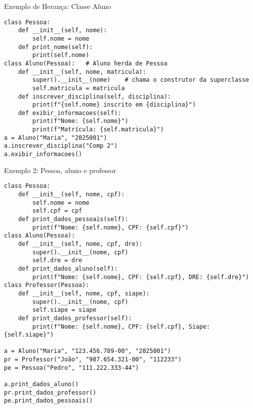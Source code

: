 \begin{frame}[fragile]{Exemplo de Herança: Classe Aluno}

    \small

    \begin{verbatim}
class Pessoa:
    def __init__(self, nome):
        self.nome = nome
    def print_nome(self):
        print(self.nome)
class Aluno(Pessoa):   # Aluno herda de Pessoa
    def __init__(self, nome, matricula):
        super().__init__(nome)    # chama o construtor da superclasse
        self.matricula = matricula
    def inscrever_disciplina(self, disciplina):
        print(f"{self.nome} inscrito em {disciplina}")
    def exibir_informacoes(self):
        print(f"Nome: {self.nome}")
        print(f"Matrícula: {self.matricula}")
a = Aluno("Maria", "2025001")
a.inscrever_disciplina("Comp 2")
a.exibir_informacoes()
\end{verbatim}

\end{frame}



\begin{frame}[fragile]{Exemplo 2: Pessoa, aluno e professor}

    \small
    \begin{verbatim}
class Pessoa:
    def __init__(self, nome, cpf):
        self.nome = nome
        self.cpf = cpf
    def print_dados_pessoais(self):
        print(f"Nome: {self.nome}, CPF: {self.cpf}")
class Aluno(Pessoa):
    def __init__(self, nome, cpf, dre):
        super().__init__(nome, cpf)
        self.dre = dre
    def print_dados_aluno(self):
        print(f"Nome: {self.nome}, CPF: {self.cpf}, DRE: {self.dre}")
class Professor(Pessoa):
    def __init__(self, nome, cpf, siape):
        super().__init__(nome, cpf)
        self.siape = siape
    def print_dados_professor(self):
        print(f"Nome: {self.nome}, CPF: {self.cpf}, Siape: {self.siape}")

a = Aluno("Maria", "123.456.789-00", "2025001")
pr = Professor("João", "987.654.321-00", "112233")
pe = Pessoa("Pedro", "111.222.333-44")

a.print_dados_aluno()
pr.print_dados_professor()
pe.print_dados_pessoais()
\end{verbatim}

\end{frame}


